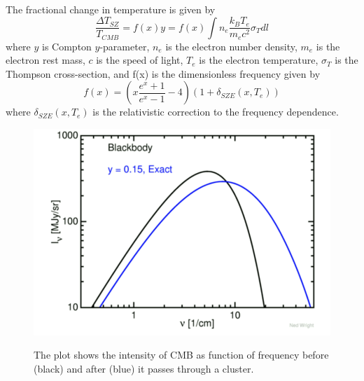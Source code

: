 The fractional change in temperature is given by 
\begin{equation}
\label{eq:sz_eqn}
\frac{\Delta T_{SZ}}{T_{CMB}} = f(x) y = f(x) \int n_{e} \frac{k_{B}T_{e}}{m_{e}c^{2}} \sigma_{T} dl
\end{equation}
where $y$ is Compton $y$-parameter, $n_{e}$ is the electron number density, $m_{e}$ is the electron rest mass, $c$ is the speed of light,  $T_{e}$ is the electron temperature, $\sigma_{T}$ is the Thompson cross-section, and f(x) is the dimensionless frequency given by
\begin{equation}
f(x) = (x\frac{e^{x}+1}{e^{x}-1} -4)(1 + \delta_{SZE}(x,T_{e}))
\end{equation} 
where $\delta_{SZE}(x,T_{e})$ is the relativistic correction to the frequency dependence.
\begin{figure}
\includegraphics[width=\linewidth]{figs/tSZ_effect_Ned.png}
\label{ned_plot}
\caption{The plot shows the intensity of CMB as function of frequency before (black) and after (blue) it passes through a cluster. }
\end{figure}

